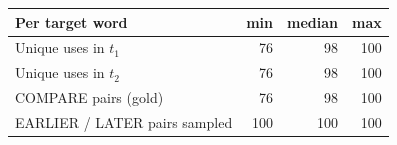 \begin{tabular}{@{}lrrr@{}}
\toprule
Per target word & min & median & max \\
\midrule
Unique uses in $t_1$ & 76 & 98 & 100 \\
Unique uses in $t_2$ & 76 & 98 & 100 \\
COMPARE pairs (gold) & 76 & 98 & 100 \\
EARLIER / LATER pairs sampled & 100 & 100 & 100 \\
\bottomrule
\end{tabular}
